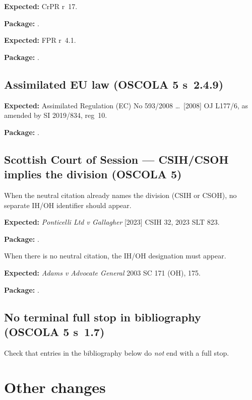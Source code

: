 \documentclass[12pt]{article}
\newcommand{\expected}[1]{\par\textbf{Expected:} #1}
\newcommand{\pkg}{\par\textbf{Package:} }
\begin{document}
\expected{%
  CrPR r~17.}

\pkg
\cite[r~17]{crpr2020}.

\expected{%
  FPR r~4.1.}

\pkg
\cite[r~4.1]{fpr2010}.


\subsection{Assimilated EU law (OSCOLA 5 s~2.4.9)}

\expected{%
  Assimilated Regulation (EC) No 593/2008 \ldots\ [2008] OJ L177/6,
  as amended by SI 2019/834, reg~10.%
}

\pkg
\cite{rome1assimilated}.

\subsection{Scottish Court of Session — CSIH/CSOH implies the division
  (OSCOLA 5)}

When the neutral citation already names the division (CSIH or CSOH),
no separate IH/OH identifier should appear.

\expected{%
  \emph{Ponticelli Ltd v Gallagher} [2023] CSIH 32, 2023 SLT 823.%
}

\pkg
\cite{ponticelli23}.

When there is no neutral citation, the IH/OH designation must appear.

\expected{%
  \emph{Adams v Advocate General} 2003 SC 171 (OH), 175.%
}

\pkg
\cite[175]{adams03}.

\subsection{No terminal full stop in bibliography
  (OSCOLA 5 s~1.7)}

Check that entries in the bibliography below do \emph{not} end with a
full stop.

\section{Other changes}
\end{document}
